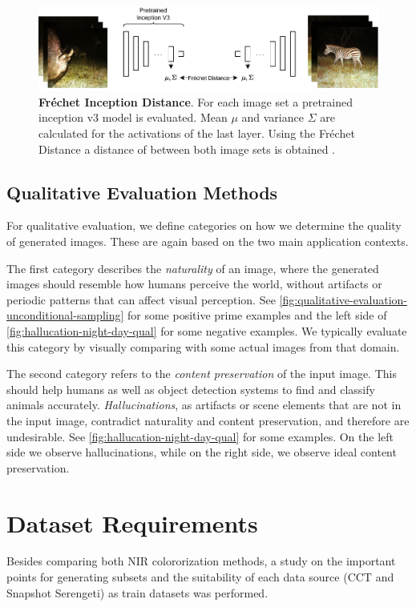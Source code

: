 \begin{figure}[htp!]
    \centering
    \includegraphics[width=.9\textwidth]{gfx/FID.pdf}
    \caption{
        \textbf{Fréchet Inception Distance}.
        For each image set a pretrained inception v3 model is evaluated.
        Mean $\mu$ and variance $\Sigma$ are calculated for the activations of the last layer.
        Using the Fréchet Distance a distance of between both image sets is obtained \parencite{ttur}.
    }
    \label{fig:fid}
\end{figure}

\label{sec:evaluate-fid}

\subsection{Qualitative Evaluation Methods}
For qualitative evaluation, we define categories on how we determine the quality of generated images. These are again based on the two main application contexts.

The first category describes the \textit{naturality} of an image, where the generated images should resemble how humans perceive the world, without artifacts or periodic patterns that can affect visual perception.
See \autoref{fig:qualitative-evaluation-unconditional-sampling} for some positive prime examples and the left side of \autoref{fig:hallucation-night-day-qual} for some negative examples.
We typically evaluate this category by visually comparing with some actual images from that domain. 

The second category refers to the \textit{content preservation} of the input image. This should help humans as well as object detection systems to find and classify animals accurately.
\textit{Hallucinations}, as artifacts or scene elements that are not in the input image, contradict naturality and content preservation, and therefore are undesirable. 
See \autoref{fig:hallucation-night-day-qual} for some examples. On the left side we observe hallucinations, while on the right side, 
we observe ideal content preservation.  

\section{Dataset Requirements}
Besides comparing both NIR colororization methods, a study on the important points for generating subsets and the suitability of each data source
(CCT and Snapshot Serengeti) as train datasets was performed.

